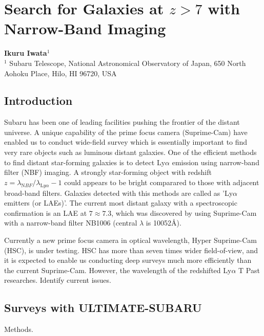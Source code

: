 \def\thisdir{science/veryhighz/}


\section{Search for Galaxies at $z>7$ with Narrow-Band Imaging
\label{sec:nbf}}

\noindent
\begin{center}
{\bf Ikuru Iwata$^{1}$}\\
$^1$ Subaru Telescope, National Astronomical Observatory of Japan, 650
North Aohoku Place, Hilo, HI 96720, USA
\end{center}
\vspace{0.5cm}

\subsection{Introduction}

Subaru has been one of leading facilities pushing the frontier of
the distant universe. A unique capability of the prime focus camera
(Suprime-Cam) have enabled us to conduct wide-field survey which is
essentially important to find very rare objects such as luminous distant
galaxies. One of the efficient methods to find distant star-forming
galaxies is to detect Ly$\alpha$ emission using narrow-band filter (NBF) 
imaging. A strongly star-forming object with redshift 
$z = \lambda_{\mathrm NBF} / \lambda_{\mathrm Ly\alpha} -1$ could
appears to be bright comparared to those with adjacent broad-band
filters. Galaxies detected with this methods are called as 'Ly$\alpha$
emitters (or LAEs)'. The current most distant galaxy with a spectroscopic 
confirmation is an LAE at $7\approx 7.3$, which was discovered by
\citet{Shibuya2012} using Suprime-Cam with a narrow-band filter NB1006
(central $\lambda$ is 10052\AA).

Currently a new prime focus camera in optical wavelength,
Hyper Suprime-Cam (HSC), is under testing. HSC has more than seven times
wider field-of-view, and it is expected to enable us conducting deep
surveys much more efficiently than the current Suprime-Cam.
However, the wavelength of the redshifted Ly$\alpha$
T
Past researches.
Identify current issues.

\subsection{Surveys with ULTIMATE-SUBARU}

Methods.

